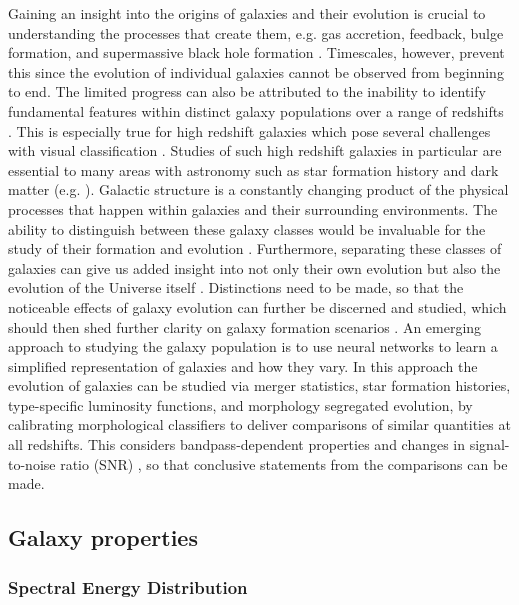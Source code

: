 \documentclass[fleqn,usenatbib]{mnras}
\begin{document}
Gaining an insight into the origins of galaxies and their evolution is crucial to understanding the processes that create them, e.g. gas accretion, feedback, bulge formation, and supermassive black hole formation \citep{Huertas-Company2020}. Timescales, however, prevent this since the evolution of individual galaxies cannot be observed from beginning to end. The limited progress can also be attributed to the inability to identify fundamental features within distinct galaxy populations over a range of redshifts \citep{Peng2002}. This is especially true for high redshift galaxies which pose several challenges with visual classification \citep{Galloway2017}. Studies of such high redshift galaxies in particular are essential to many areas with astronomy such as star formation history and dark matter (e.g. \citet{Lapi2017,Ferguson2004}). Galactic structure is a constantly changing product of the physical processes that happen within galaxies and their surrounding environments. The ability to distinguish between these galaxy classes would be invaluable for the study of their formation and evolution \citep{Bamford2009,Roberts1994}. Furthermore, separating these classes of galaxies can give us added insight into not only their own evolution but also the evolution of the Universe itself \citep{Ferreira2018}. Distinctions need to be made, so that the noticeable effects of galaxy evolution can further be discerned and studied, which should then shed further clarity on galaxy formation scenarios \citep{Conselice2003}. 
An emerging approach to studying the galaxy population is to use neural networks to learn a simplified representation of galaxies and how they vary. In this approach the evolution of galaxies can be studied via merger statistics, star formation histories, type-specific luminosity functions, and morphology segregated evolution, by calibrating morphological classifiers to deliver comparisons of similar quantities at all redshifts. This considers bandpass-dependent properties and changes in signal-to-noise ratio (SNR) \citep{Barden2008}, so that conclusive statements from the comparisons can be made.


\subsection{Galaxy properties}
\label{sec:properties}

\subsubsection{Spectral Energy Distribution}
\label{sec:SEDs}
\end{document}
